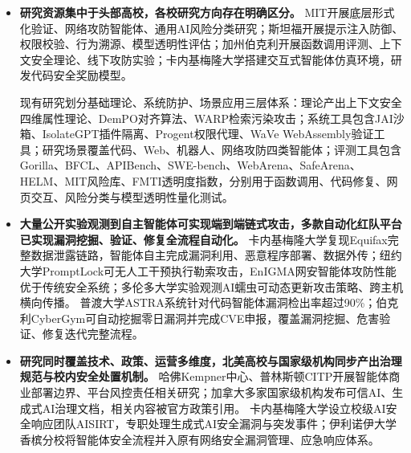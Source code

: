 \begin{itemize}[tabitem]
\item \textbf{研究资源集中于头部高校，各校研究方向存在明确区分。}
MIT开展底层形式化验证、网络攻防智能体、通用AI风险分类研究\cite{mitRus2026,mitCSSGroup2026,mitAIRiskRepo2026}；斯坦福开展提示注入防御、权限校验、行为溯源、模型透明性评估\cite{stanfordHAI2026,stanfordCRFM2026}；加州伯克利开展函数调用评测、上下文安全理论、线下攻防实验\cite{berkeleyBAIR2026,contextsecurity2026}；卡内基梅隆大学搭建交互式智能体仿真环境，研发代码安全奖励模型\cite{seccodeprm2026}。

现有研究划分基础理论、系统防护、场景应用三层体系：理论产出上下文安全四维属性理论\cite{contextsecurity2026}、DemPO对齐算法\cite{dempo2026}、WARP检索污染攻击\cite{warp2026}；系统工具包含JAI沙箱\cite{stanfordJai2026}、IsolateGPT插件隔离、Progent权限代理\cite{progent2025}、WaVe WebAssembly验证工具；研究场景覆盖代码、Web、机器人、网络攻防四类智能体；评测工具包含Gorilla、BFCL、APIBench、SWE-bench、WebArena、SafeArena\cite{safearena2025}、HELM、MIT风险库\cite{mitAIRiskRepo2026}、FMTI透明度指数，分别用于函数调用、代码修复、网页交互、风险分类与模型透明性量化测试。

\item \textbf{大量公开实验观测到自主智能体可实现端到端链式攻击，多款自动化红队平台已实现漏洞挖掘、验证、修复全流程自动化。}
卡内基梅隆大学复现Equifax完整数据泄露链路，智能体自主完成漏洞利用、恶意程序部署、数据外传\cite{equifaxsim2025}；纽约大学PromptLock可无人工干预执行勒索攻击，EnIGMA网安智能体攻防性能优于传统安全系统\cite{promptlock2025}；多伦多大学实验观测AI蠕虫可动态更新攻击策略、跨主机横向传播\cite{aiworm2026}。
%
普渡大学ASTRA系统针对代码智能体漏洞检出率超过90\%\cite{astra2025}；伯克利CyberGym可自动挖掘零日漏洞并完成CVE申报，覆盖漏洞挖掘、危害验证、修复迭代完整流程\cite{cybergym2025}。

\item \textbf{研究同时覆盖技术、政策、运营多维度，北美高校与国家级机构同步产出治理规范与校内安全处置机制。}
哈佛Kempner中心、普林斯顿CITP开展智能体商业部署边界、平台风控责任相关研究\cite{berkmanklein2026,princetonCITP2026}；加拿大多家国家级机构发布可信AI、生成式AI治理文档，相关内容被官方政策引用\cite{vectorResponsibleAI2025,caisi2026}。
卡内基梅隆大学设立校级AI安全响应团队AISIRT，专职处理生成式AI安全漏洞与突发事件\cite{cmuAISIRT2026}；伊利诺伊大学香槟分校将智能体安全流程并入原有网络安全漏洞管理、应急响应体系\cite{uiucCSL2026}。
\end{itemize}

\begingroup

